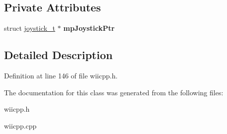 \subsection*{Private Attributes}
\begin{DoxyCompactItemize}
\item 
\hypertarget{class_c_joystick_a3bb1adef8ad30963f24979bd6ff1a3b7}{struct \hyperlink{structjoystick__t}{joystick\-\_\-t} $\ast$ {\bfseries mp\-Joystick\-Ptr}}\label{class_c_joystick_a3bb1adef8ad30963f24979bd6ff1a3b7}

\end{DoxyCompactItemize}


\subsection{Detailed Description}


Definition at line 146 of file wiicpp.\-h.



The documentation for this class was generated from the following files\-:\begin{DoxyCompactItemize}
\item 
wiicpp.\-h\item 
wiicpp.\-cpp\end{DoxyCompactItemize}
